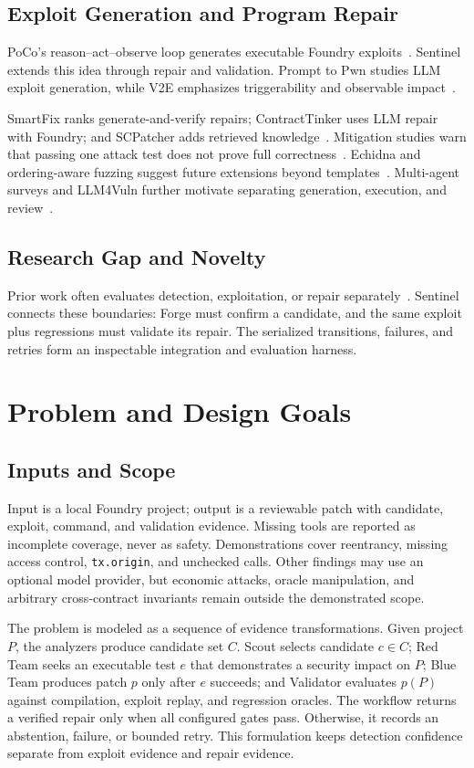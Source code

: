 \documentclass[conference,a4paper,10pt]{IEEEtran}
\newcommand{\code}[1]{\texttt{#1}}
\begin{document}
\subsection{Exploit Generation and Program Repair}
PoCo's reason--act--observe loop generates executable Foundry exploits~\cite{poco}. Sentinel extends this idea through repair and validation. Prompt to Pwn studies LLM exploit generation, while V2E emphasizes triggerability and observable impact~\cite{prompttopwn,v2e}.

SmartFix ranks generate-and-verify repairs; ContractTinker uses LLM repair with Foundry; and SCPatcher adds retrieved knowledge~\cite{smartfix,contracttinker,scpatcher}. Mitigation studies warn that passing one attack test does not prove full correctness~\cite{mitigation}. Echidna and ordering-aware fuzzing suggest future extensions beyond templates~\cite{echidna,fuzzordering}. Multi-agent surveys and LLM4Vuln further motivate separating generation, execution, and review~\cite{multise,llm4vuln}.

\subsection{Research Gap and Novelty}
Prior work often evaluates detection, exploitation, or repair separately~\cite{slither,poco,smartfix,contracttinker,scpatcher}. Sentinel connects these boundaries: Forge must confirm a candidate, and the same exploit plus regressions must validate its repair. The serialized transitions, failures, and retries form an inspectable integration and evaluation harness.

\section{Problem and Design Goals}
\subsection{Inputs and Scope}
Input is a local Foundry project; output is a reviewable patch with candidate, exploit, command, and validation evidence. Missing tools are reported as incomplete coverage, never as safety. Demonstrations cover reentrancy, missing access control, \code{tx.origin}, and unchecked calls. Other findings may use an optional model provider, but economic attacks, oracle manipulation, and arbitrary cross-contract invariants remain outside the demonstrated scope.

The problem is modeled as a sequence of evidence transformations. Given project $P$, the analyzers produce candidate set $C$. Scout selects candidate $c\in C$; Red Team seeks an executable test $e$ that demonstrates a security impact on $P$; Blue Team produces patch $p$ only after $e$ succeeds; and Validator evaluates $p(P)$ against compilation, exploit replay, and regression oracles. The workflow returns a verified repair only when all configured gates pass. Otherwise, it records an abstention, failure, or bounded retry. This formulation keeps detection confidence separate from exploit evidence and repair evidence.
\end{document}
